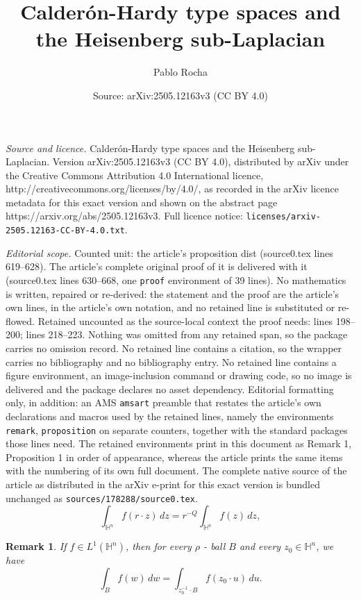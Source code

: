 \documentclass[10pt,a4paper]{amsart}
\title{Calder\'on-Hardy type spaces and the Heisenberg sub-Laplacian}
\author{Pablo Rocha}
\date{Source: arXiv:2505.12163v3 (CC BY 4.0)}
\newtheorem{remark}{Remark}
\begin{document}
\maketitle

\noindent\emph{Source and licence.} Calder\'on-Hardy type spaces and the Heisenberg sub-Laplacian. Version arXiv:2505.12163v3 (CC BY 4.0), distributed by arXiv under the Creative Commons Attribution 4.0 International licence, http://creativecommons.org/licenses/by/4.0/, as recorded in the arXiv licence metadata for this exact version and shown on the abstract page https://arxiv.org/abs/2505.12163v3. Full licence notice: \texttt{licenses/arxiv-2505.12163-CC-BY-4.0.txt}.\par\smallskip

\noindent\textit{Editorial scope.} Counted unit: the article's proposition dist (source0.tex lines 619--628). The article's complete original proof of it is delivered with it (source0.tex lines 630--668, one \texttt{proof} environment of 39 lines). No mathematics is written, repaired or re-derived: the statement and the proof are the article's own lines, in the article's own notation, and no retained line is substituted or re-flowed.  Retained uncounted as the source-local context the proof needs: lines 198--200; lines 218--223.  Nothing was omitted from any retained span, so the package carries no omission record.  No retained line contains a citation, so the wrapper carries no bibliography and no bibliography entry.  No retained line contains a figure environment, an image-inclusion command or drawing code, so no image is delivered and the package declares no asset dependency.  Editorial formatting only, in addition: an AMS \texttt{amsart} preamble that restates the article's own declarations and macros used by the retained lines, namely the environments \texttt{remark}, \texttt{proposition} on separate counters, together with the standard packages those lines need.  The retained environments print in this document as Remark 1, Proposition 1 in order of appearance, whereas the article prints the same items with the numbering of its own full document.  The complete native source of the article as distributed in the arXiv e-print for this exact version is bundled unchanged as \texttt{sources/178288/source0.tex}.
\begin{equation} \label{homog dim}
\int_{\mathbb{H}^{n}} f(r \cdot z) \, dz = r^{-Q} \int_{\mathbb{H}^{n}} f(z) \, dz,
\end{equation}

\begin{remark} \label{cambio de centro}
If $f \in L^{1}(\mathbb{H}^{n})$, then for every $\rho$ - ball $B$ and every $z_0 \in \mathbb{H}^{n}$, we have
\[
\int_{B} f(w) \, dw = \int_{z_{0}^{-1} \cdot B} f(z_0 \cdot u) \, du.
\]
\end{remark}
\end{document}
